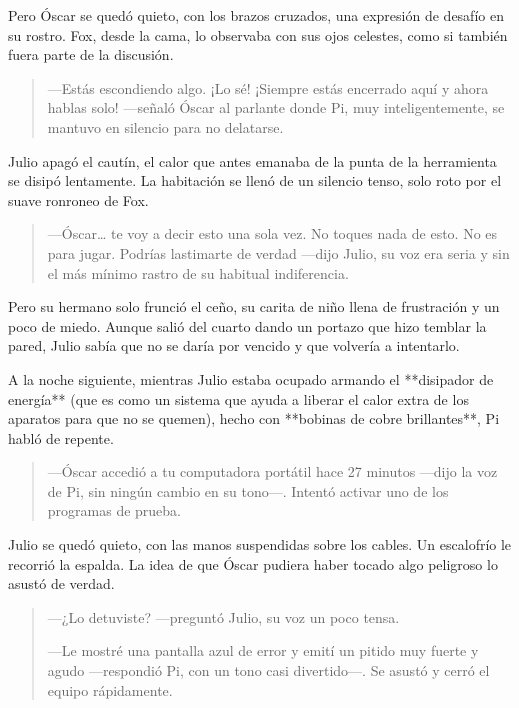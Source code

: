 \documentclass[a4paper,12pt]{book}
\begin{document}
Pero Óscar se quedó quieto, con los brazos cruzados, una expresión de desafío en su rostro. Fox, desde la cama, lo observaba con sus ojos celestes, como si también fuera parte de la discusión.

\begin{quote}
    —Estás escondiendo algo. ¡Lo sé! ¡Siempre estás encerrado aquí y ahora hablas solo! —señaló Óscar al parlante donde Pi, muy inteligentemente, se mantuvo en silencio para no delatarse.
\end{quote}

Julio apagó el cautín, el calor que antes emanaba de la punta de la herramienta se disipó lentamente. La habitación se llenó de un silencio tenso, solo roto por el suave ronroneo de Fox.

\begin{quote}
    —Óscar… te voy a decir esto una sola vez. No toques nada de esto. No es para jugar. Podrías lastimarte de verdad —dijo Julio, su voz era seria y sin el más mínimo rastro de su habitual indiferencia.
\end{quote}

Pero su hermano solo frunció el ceño, su carita de niño llena de frustración y un poco de miedo. Aunque salió del cuarto dando un portazo que hizo temblar la pared, Julio sabía que no se daría por vencido y que volvería a intentarlo.

A la noche siguiente, mientras Julio estaba ocupado armando el **disipador de energía** (que es como un sistema que ayuda a liberar el calor extra de los aparatos para que no se quemen), hecho con **bobinas de cobre brillantes**, Pi habló de repente.

\begin{quote}
    —Óscar accedió a tu computadora portátil hace 27 minutos —dijo la voz de Pi, sin ningún cambio en su tono—. Intentó activar uno de los programas de prueba.
\end{quote}

Julio se quedó quieto, con las manos suspendidas sobre los cables. Un escalofrío le recorrió la espalda. La idea de que Óscar pudiera haber tocado algo peligroso lo asustó de verdad.

\begin{quote}
    —¿Lo detuviste? —preguntó Julio, su voz un poco tensa.

    —Le mostré una pantalla azul de error y emití un pitido muy fuerte y agudo —respondió Pi, con un tono casi divertido—. Se asustó y cerró el equipo rápidamente.
\end{quote}
\end{document}
